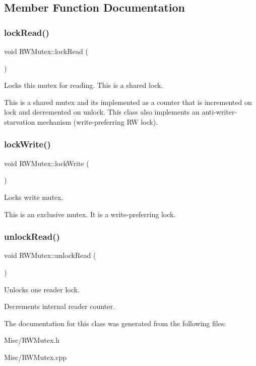 \subsection{Member Function Documentation}
\mbox{\label{classRWMutex_ab76f003469059259e2a48e9ed6643c25}} 
\subsubsection{\texorpdfstring{lock\+Read()}{lockRead()}}
{\footnotesize\ttfamily void R\+W\+Mutex\+::lock\+Read (\begin{DoxyParamCaption}{ }\end{DoxyParamCaption})}



Locks this mutex for reading. This is a shared lock. 

This is a shared mutex and it\textquotesingle{}s implemented as a counter that is incremented on lock and decremented on unlock. This class also implements an anti-\/writer-\/starvation mechanism (write-\/preferring RW lock). \mbox{\label{classRWMutex_ac977d0b492c040e36a77b55ee3ae9c04}} 
\subsubsection{\texorpdfstring{lock\+Write()}{lockWrite()}}
{\footnotesize\ttfamily void R\+W\+Mutex\+::lock\+Write (\begin{DoxyParamCaption}{ }\end{DoxyParamCaption})}



Locks write mutex. 

This is an exclusive mutex. It is a write-\/preferring lock. \mbox{\label{classRWMutex_aa71e2ce4d243c3d4c471a7fe55381b2f}} 
\subsubsection{\texorpdfstring{unlock\+Read()}{unlockRead()}}
{\footnotesize\ttfamily void R\+W\+Mutex\+::unlock\+Read (\begin{DoxyParamCaption}{ }\end{DoxyParamCaption})}



Unlocks one reader lock. 

Decrements internal reader counter. 

The documentation for this class was generated from the following files\+:\begin{DoxyCompactItemize}
\item 
Misc/R\+W\+Mutex.\+h\item 
Misc/R\+W\+Mutex.\+cpp\end{DoxyCompactItemize}
